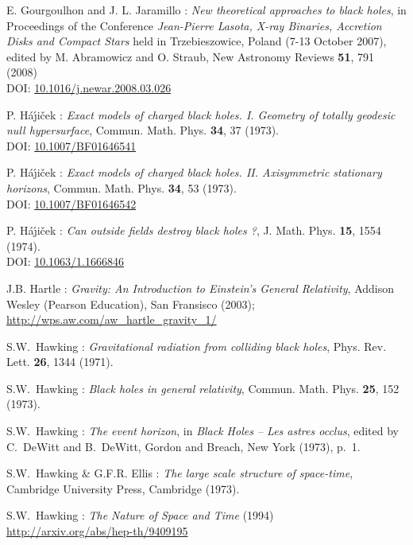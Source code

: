 \begin{thebibliography}{123}
E. Gourgoulhon and J. L. Jaramillo : {\em New theoretical approaches to black holes},
in Proceedings of the Conference {\em Jean-Pierre Lasota, X-ray Binaries, Accretion Disks and Compact Stars} held in Trzebieszowice, Poland (7-13 October 2007), edited by M. Abramowicz and O. Straub, New Astronomy Reviews {\bf 51}, 791 (2008) \\
DOI: \href{http://dx.doi.org/doi:10.1016/j.newar.2008.03.026}{10.1016/j.newar.2008.03.026}

P. H\'a\'\j i\v{c}ek : {\em Exact models of charged black holes. I. Geometry
of totally geodesic null hypersurface},
Commun. Math. Phys. {\bf 34}, 37 (1973). \\
DOI: \href{http://dx.doi.org/10.1007/BF01646541}{10.1007/BF01646541}

P. H\'a\'\j i\v{c}ek : {\em Exact models of charged black holes.
II. Axisymmetric stationary horizons},
Commun. Math. Phys. {\bf 34}, 53 (1973). \\
DOI: \href{http://dx.doi.org/10.1007/BF01646542}{10.1007/BF01646542}

P. H\'a\'\j i\v{c}ek : {\em Can outside fields destroy black holes ?},
J. Math. Phys. {\bf 15}, 1554 (1974). \\
DOI: \href{http://dx.doi.org/10.1063/1.1666846}{10.1063/1.1666846}

J.B. Hartle : \emph{Gravity: An Introduction to Einstein's General Relativity},
Addison Wesley (Pearson Education), San Fransisco (2003); \\
\url{http://wps.aw.com/aw_hartle_gravity_1/}

S.W.~Hawking : {\em Gravitational radiation from colliding black holes},
Phys. Rev. Lett. {\bf 26}, 1344 (1971).

S.W.~Hawking : {\em Black holes in general relativity},
Commun. Math. Phys. {\bf 25}, 152 (1973).

S.W.~Hawking : {\em The event horizon},
in {\em Black Holes -- Les astres occlus}, edited by C.~DeWitt and B.~DeWitt,
Gordon and Breach, New York (1973), p.~1.

S.W.~Hawking \& G.F.R. Ellis : {\em The large scale structure of
space-time},
Cambridge University Press, Cambridge (1973).

S.W.~Hawking : {\em The Nature of Space and Time} (1994)\\
\url{http://arxiv.org/abs/hep-th/9409195}


\end{thebibliography}
